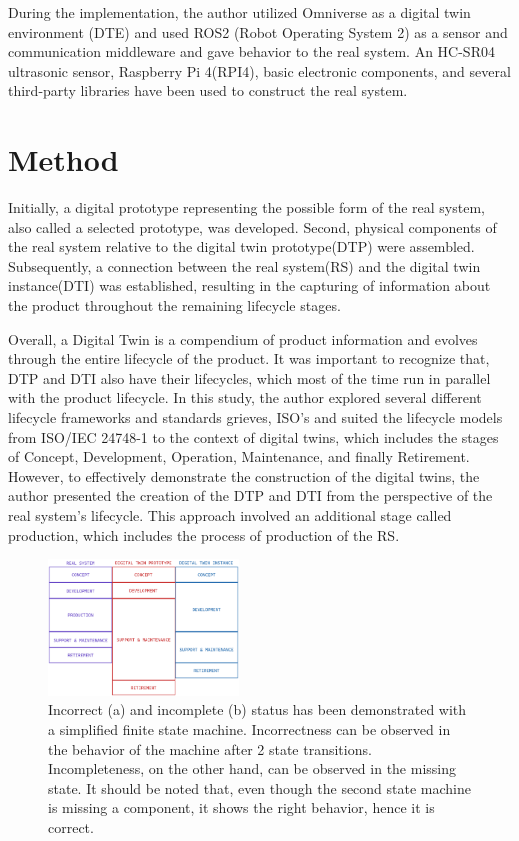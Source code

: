 \documentclass[conference]{IEEEtran}
\begin{document}
    During the implementation, the author utilized Omniverse as a digital twin environment (DTE) and used ROS2 (Robot Operating System 2) 
    as a sensor and communication middleware and gave behavior to the real system. An HC-SR04 ultrasonic sensor, Raspberry Pi 4(RPI4), 
    basic electronic components, and several third-party libraries have been used to construct the real system. 

    \section{Method}\label{section:Method}
    Initially, a digital prototype representing the possible form of the real system, 
    also called a selected prototype, was developed. Second, physical components of the real system 
    relative to the digital twin prototype(DTP) were assembled. Subsequently, a connection between the real system(RS) 
    and the digital twin instance(DTI) was established, 
    resulting in the capturing of information about the product throughout the remaining lifecycle stages.

    Overall, a Digital Twin is a compendium of product information and evolves through the entire lifecycle of the product.
    It was important to recognize that, DTP and DTI also have their lifecycles,
    which most of the time run in parallel with the product lifecycle. 
    In this study, the author explored several different lifecycle frameworks and standards {grieves, ISO's} and 
    suited the lifecycle models from ISO/IEC 24748-1 to the context of digital twins, which includes the stages of  
    Concept, Development, Operation, Maintenance, and finally Retirement.  However, to effectively demonstrate the construction of the digital twins, 
    the author presented the creation of the DTP and DTI from the perspective of the real system's lifecycle. This approach involved an additional stage called production, 
    which includes the process of production of the RS.
    
    \begin{figure}[htbp]
        \centering
        \includegraphics[width=0.45\textwidth]{LIFECYCLE.png}
        \caption{Incorrect (a) and incomplete (b) status has been demonstrated with a simplified finite state machine. Incorrectness can be observed in the behavior 
        of the machine after 2 state transitions. Incompleteness, on the other hand, can be observed in the missing state. It should be noted that, even though the second state machine is missing a 
        component, it shows the right behavior, hence it is correct.}\label{fig:LIFECYCLE}
    \end{figure}
    
\end{document}
